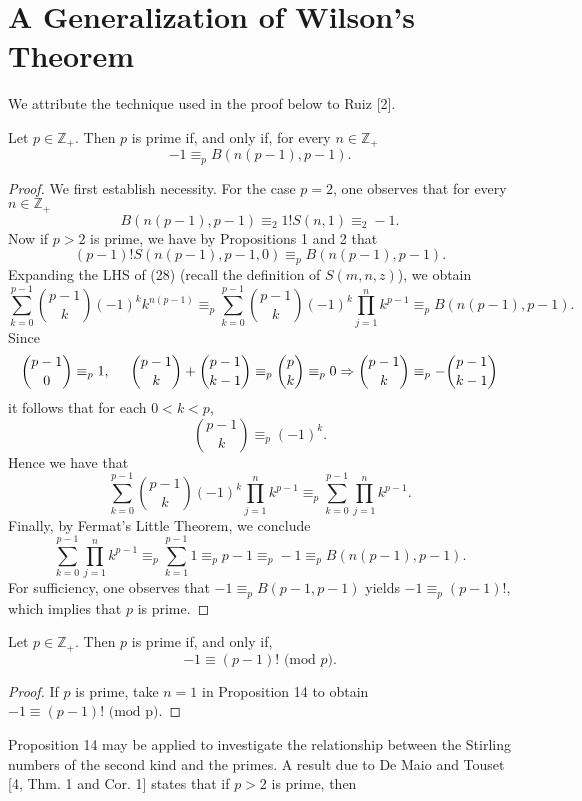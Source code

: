 \documentclass[]{amsart}
\begin{document}
\section{A Generalization of Wilson's Theorem}
We attribute the technique used in the proof below to Ruiz [2].
\begin{prop}
Let $p \in \mathbb{Z}_{+}$.  Then $p$ is prime if, and only if, for every $n \in \mathbb{Z}_{+}$
\[ -1 \equiv_{p} B(n(p-1),p-1). \]
\end{prop}
\begin{proof}
We first establish necessity.  For the case $p = 2$, one observes that for every $n \in \mathbb{Z}_{+}$
\[ B(n(p-1),p-1) \equiv_{2} 1!S(n,1) \equiv_{2} -1.  \]
Now if $p > 2$ is prime, we have by Propositions 1 and 2 that
\begin{equation}
(p-1)!S(n(p-1),p-1,0) \equiv_{p} B(n(p-1),p-1).
\end{equation}
Expanding the LHS of (28) (recall the definition of $S(m,n,z)$), we obtain
\[ \sum_{k=0}^{p-1}{p-1 \choose k}(-1)^{k}k^{n(p-1)} \equiv_{p} \sum_{k=0}^{p-1}{p-1 \choose k}(-1)^{k}\prod_{j=1}^{n}k^{p-1} \equiv_{p} B(n(p-1),p-1). \]
Since
\[ {p-1 \choose 0} \equiv_{p} 1, \hspace{5mm}  {p-1 \choose k} + {p-1 \choose k-1} \equiv_{p} {p \choose k} \equiv_{p} 0 \Rightarrow {p-1 \choose k} \equiv_{p} -{p-1 \choose k-1}\]
it follows that for each $0 < k < p$,
\[ {p-1 \choose k} \equiv_{p} (-1)^{k}.  \]
Hence we have that
\[ \sum_{k=0}^{p-1}{p-1 \choose k}(-1)^{k}\prod_{j=1}^{n}k^{p-1} \equiv_{p} \sum_{k=0}^{p-1}\prod_{j=1}^{n}k^{p-1}. \]
Finally, by Fermat's Little Theorem, we conclude
\[ \sum_{k=0}^{p-1}\prod_{j=1}^{n}k^{p-1} \equiv_{p} \sum_{k=1}^{p-1}1 \equiv_{p} p-1 \equiv_{p} -1 \equiv_{p} B(n(p-1),p-1). \]
For sufficiency, one observes that $-1 \equiv_{p} B(p-1,p-1)$ yields $-1 \equiv_{p} (p-1)!$, which implies that $p$ is prime.
\end{proof}
\begin{cor}
Let $p \in \mathbb{Z}_{+}$.  Then $p$ is prime if, and only if,
\[ -1 \equiv (p-1)! \mbox{ (mod $p$)}. \]
\end{cor}
\begin{proof}
If $p$ is prime, take $n = 1$ in Proposition 14 to obtain $-1 \equiv (p-1)! \mbox{ (mod p)}$.
\end{proof}
Proposition 14 may be applied to investigate the relationship between the Stirling numbers of the second kind and the primes.  A result due to De Maio and Touset [4, Thm. 1 and Cor. 1] states that if $p > 2$ is prime, then
\end{document}
